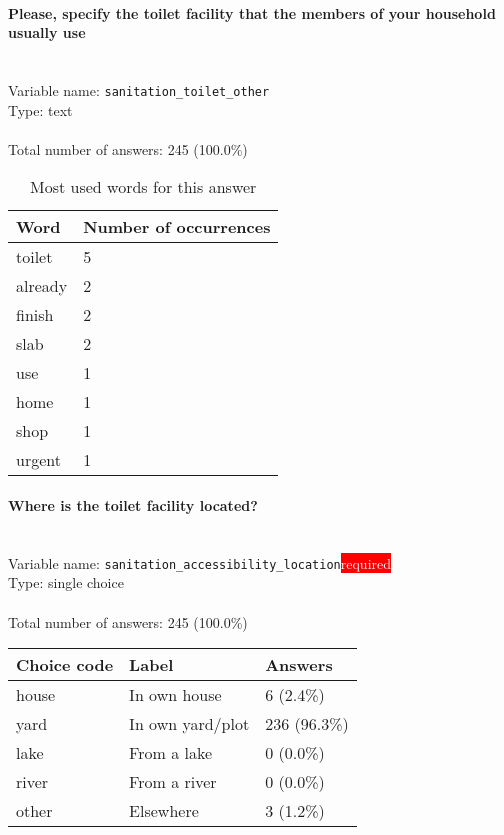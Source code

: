 \documentclass[11.5pt, a4paper]{scrartcl}
\begin{document}
\paragraph{Please, specify the toilet facility that the members of your household usually use}
\  \\Variable name: \texttt{sanitation\_toilet\_other}\\
Type: text\\
\\Total number of answers: 245 (100.0\%)
\\[0.2em]\begin{table}[H]
 \begin{tabular}{p{4cm}|p{8cm}}
Word & Number of occurrences  \\
\hline
\cellcolor{mygray}toilet&\cellcolor{mygray}5\\
\hline
already&2\\
\hline
\cellcolor{mygray}finish&\cellcolor{mygray}2\\
\hline
slab&2\\
\hline
\cellcolor{mygray}use&\cellcolor{mygray}1\\
\hline
home&1\\
\hline
\cellcolor{mygray}shop&\cellcolor{mygray}1\\
\hline
urgent&1\\
\hline
\end{tabular}
\caption{\label{tab:table-name} Most used words for this answer}
\end{table}
\paragraph{Where is the toilet facility located? }
\  \\Variable name: \texttt{sanitation\_accessibility\_location}\hfill\colorbox{red}{\small{\textcolor{white}{required}}}\\
 Type: single choice\\
\\Total number of answers: 245 (100.0\%)
\\[0.2em] \begin{tabular}{p{4cm}|p{8cm}|p{3cm}}
Choice code & Label & Answers \\
\hline
house & In own house& \cellcolor{color0}6 (2.4\%)\\
\cellcolor{mygray} yard & \cellcolor{mygray}In own yard/plot & \cellcolor{color4}236 (96.3\%)\\
lake & From a lake& \cellcolor{color0}0 (0.0\%)\\
\cellcolor{mygray} river & \cellcolor{mygray}From a river & \cellcolor{color0}0 (0.0\%)\\
other & Elsewhere& \cellcolor{color0}3 (1.2\%)\\
\end{tabular}
\end{document}
